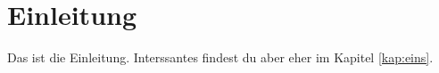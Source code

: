\chapter{Einleitung}
Das ist die Einleitung. Interssantes findest du aber eher im Kapitel \ref{kap:eins}.